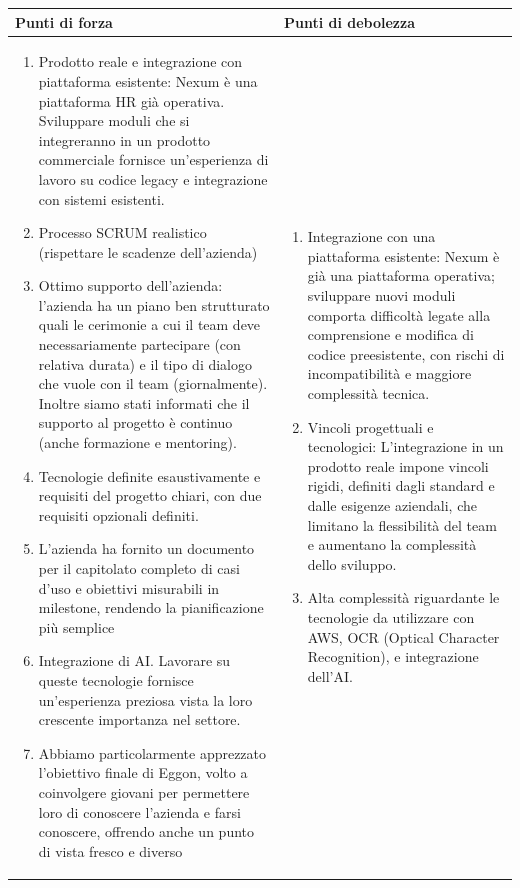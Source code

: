\documentclass[a4paper,11pt]{article}
\begin{document}
{\footnotesize
\begin{tabularx}{\textwidth}{|X|X|}
\hline
\rowcolor{lightgray!40} %
\textbf{Punti di forza} & \textbf{Punti di debolezza} \\
\hline
\begin{enumerate}
\item Prodotto reale e integrazione con piattaforma esistente: Nexum è una piattaforma HR già operativa. Sviluppare moduli che si integreranno in un prodotto commerciale fornisce un'esperienza di lavoro su codice legacy e integrazione con sistemi esistenti.
\item Processo SCRUM realistico (rispettare le scadenze dell'azienda)
\item Ottimo supporto dell'azienda: l'azienda ha un piano ben strutturato quali le cerimonie a cui il team deve necessariamente partecipare (con relativa durata) e il tipo di dialogo che vuole con il team (giornalmente). Inoltre siamo stati informati che il supporto al progetto è continuo (anche formazione e mentoring).
\item Tecnologie definite esaustivamente e requisiti del progetto chiari, con due requisiti opzionali definiti.
\item L'azienda ha fornito un documento per il capitolato completo di casi d'uso e obiettivi misurabili in milestone, rendendo la pianificazione più semplice
\item Integrazione di AI. Lavorare su queste tecnologie fornisce un'esperienza preziosa vista la loro crescente importanza nel settore.
\item Abbiamo particolarmente apprezzato l'obiettivo finale di Eggon, volto a coinvolgere giovani per permettere loro di conoscere l'azienda e farsi conoscere, offrendo anche un punto di vista fresco e diverso
\end{enumerate}
& 
\begin{enumerate}
 \item Integrazione con una piattaforma esistente: Nexum è già una piattaforma operativa; sviluppare nuovi moduli comporta difficoltà legate alla comprensione e modifica di codice preesistente, con rischi di incompatibilità e maggiore complessità tecnica.
  \item Vincoli progettuali e tecnologici: L'integrazione in un prodotto reale impone vincoli rigidi, definiti dagli standard e dalle esigenze aziendali, che limitano la flessibilità del team e aumentano la complessità dello sviluppo.
\item Alta complessità riguardante le tecnologie da utilizzare con AWS, OCR (Optical Character Recognition), e integrazione dell'AI.
\end{enumerate} \\
\hline
\end{tabularx}
}
\end{document}
